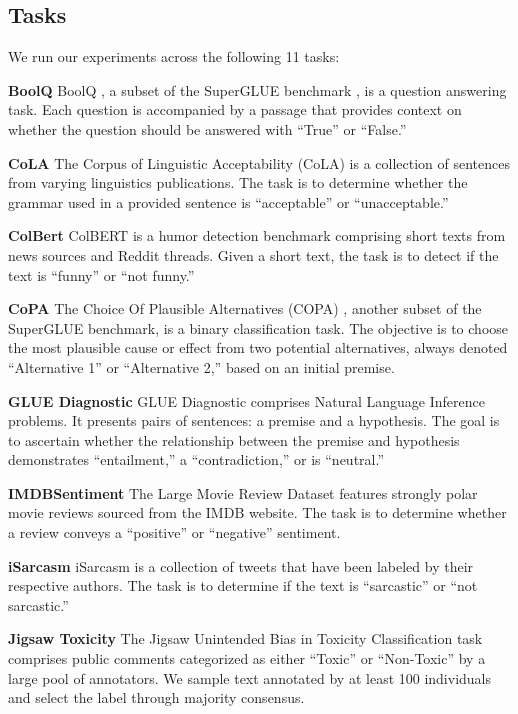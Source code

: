 \documentclass[11pt, dvipsnames]{article}
\begin{document}
\subsection{Tasks}
\label{sec:tasks}
We run our experiments across the following 11 tasks:

\textbf{BoolQ} BoolQ \citep{clark2019boolq}, a subset of the SuperGLUE benchmark \citep{wang2020superglue}, is a question answering task. Each question is accompanied by a passage that provides context on whether the question should be answered with ``True'' or ``False.''

\textbf{CoLA}
The Corpus of Linguistic Acceptability (CoLA) \citep{10.1162/tacl_a_00290} is a collection of sentences from varying linguistics publications. The task is to determine whether the grammar used in a provided sentence is ``acceptable'' or ``unacceptable.''

\textbf{ColBert}
ColBERT \citep{annamoradnejad2022colbert} is a humor detection benchmark comprising short texts from news sources and Reddit threads. Given a short text, the task is to detect if the text is ``funny'' or ``not funny.''

\textbf{CoPA}
The Choice Of Plausible Alternatives (COPA) \citep{roemmele2011choice}, another subset of the SuperGLUE benchmark, is a binary classification task. The objective is to choose the most plausible cause or effect from two potential alternatives, always denoted ``Alternative 1'' or ``Alternative 2,'' based on an initial premise. 

\textbf{GLUE Diagnostic} %
GLUE Diagnostic \citep{wang2020superglue} comprises Natural Language Inference problems. It presents pairs of sentences: a premise and a hypothesis. The goal is to ascertain whether the relationship between the premise and hypothesis demonstrates ``entailment,'' a ``contradiction,'' or is ``neutral.''

\textbf{IMDBSentiment}
The Large Movie Review Dataset \citep{maas-etal-2011-learning} features strongly polar movie reviews sourced from the IMDB website. The task is to determine whether a review conveys a ``positive'' or ``negative'' sentiment.

\textbf{iSarcasm}
iSarcasm \citep{oprea-magdy-2020-isarcasm} is a collection of tweets that have been labeled by their respective authors. The task is to determine if the text is ``sarcastic'' or ``not sarcastic.''

\textbf{Jigsaw Toxicity}
The Jigsaw Unintended Bias in Toxicity Classification task \citep{jigsaw-unintended-bias-in-toxicity-classification} comprises public comments categorized as either ``Toxic'' or ``Non-Toxic'' by a large pool of annotators. We sample text annotated by at least 100 individuals and select the label through majority consensus.
\end{document}
